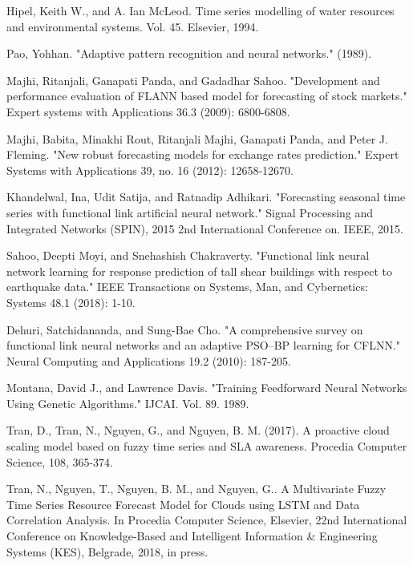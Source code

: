 \documentclass[conference]{IEEEtran}
\begin{document}
\begin{thebibliography}{00}

Hipel, Keith W., and A. Ian McLeod. Time series modelling of water resources and environmental systems. Vol. 45. Elsevier, 1994.

Pao, Yohhan. "Adaptive pattern recognition and neural networks." (1989).

Majhi, Ritanjali, Ganapati Panda, and Gadadhar Sahoo. "Development and performance evaluation of FLANN based model for forecasting of stock markets." Expert systems with Applications 36.3 (2009): 6800-6808.

Majhi, Babita, Minakhi Rout, Ritanjali Majhi, Ganapati Panda, and Peter J. Fleming. "New robust forecasting models for exchange rates prediction." Expert Systems with Applications 39, no. 16 (2012): 12658-12670.

Khandelwal, Ina, Udit Satija, and Ratnadip Adhikari. "Forecasting seasonal time series with functional link artificial neural network." Signal Processing and Integrated Networks (SPIN), 2015 2nd International Conference on. IEEE, 2015.

Sahoo, Deepti Moyi, and Snehashish Chakraverty. "Functional link neural network learning for response prediction of tall shear buildings with respect to earthquake data." IEEE Transactions on Systems, Man, and Cybernetics: Systems 48.1 (2018): 1-10.

Dehuri, Satchidananda, and Sung-Bae Cho. "A comprehensive survey on functional link neural networks and an adaptive PSO–BP learning for CFLNN." Neural Computing and Applications 19.2 (2010): 187-205.

Montana, David J., and Lawrence Davis. "Training Feedforward Neural Networks Using Genetic Algorithms." IJCAI. Vol. 89. 1989.

Tran, D., Tran, N., Nguyen, G., and Nguyen, B. M. (2017). A proactive cloud scaling model based on fuzzy time series and SLA awareness. Procedia Computer Science, 108, 365-374.

Tran, N., Nguyen, T., Nguyen, B. M., and Nguyen, G.. A Multivariate Fuzzy Time Series Resource Forecast Model for Clouds using LSTM and Data Correlation Analysis. In Procedia Computer Science, Elsevier, 22nd International Conference on Knowledge-Based and Intelligent Information $\&$ Engineering Systems (KES), Belgrade, 2018, in press.


\end{thebibliography}
\end{document}
